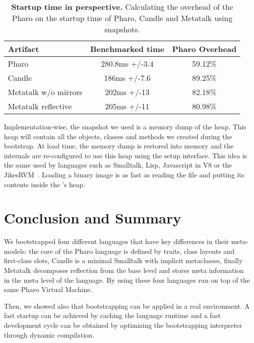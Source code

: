  \begin{table}[ht]
 	\centering
 	\begin{tabular}{lcc}
			\toprule
			\textbf{Artifact}
			& \textbf{Benchmarked time}
 			& \textbf{Pharo \VM Overhead}\\
		\toprule
		Pharo & 280.8ms +/-3.4 & 59.12\% \\\midrule
		Candle & 186ms +/-7.6 & 89.25\% \\\midrule
		Metatalk w/o mirrors &202ms +/-13 & 82.18\% \\\midrule
		Metatalk reflective &205ms +/-11 & 80.98\% \\\bottomrule
 	\end{tabular}
	\vspace*{0.2cm}
 	\caption{\small\textbf{Startup time in perspective.} Calculating the overhead of the Pharo \VM on the startup time of Pharo, Candle and Metatalk using snapshots.\label{tb:startup_overhead}}
 \end{table}
 
 

Implementation-wise, the snapshot we used is a memory dump of the \VM heap. This heap will contain all the objects, classes and methods we created during the bootstrap. At load time, the memory dump is restored into memory and the \VM internals are re-configured to use this heap using the \VM setup interface. This idea is the same used by languages such as Smalltalk, Lisp, Javascript in V8 or the JikesRVM~\cite{Alpe00a}. Loading a binary image is as fast as reading the file and putting its contents inside the \VM's heap.

\section{Conclusion and Summary}



We bootstrapped four different languages that have key differences in their meta-models: the core of the Pharo language is defined by traits, class layouts and first-class slots, Candle is a minimal Smalltalk with implicit metaclasses, finally Metatalk decomposes reflection from the base level and stores meta information in the meta level of the language. By using \Vtt these four languages run on top of the same Pharo Virtual Machine.

Then, we showed also that bootstrapping can be applied in a real environment. A fast startup can be achieved by caching the language runtime and a fast development cycle can be obtained by optimizing the bootstrapping interpreter through dynamic compilation.

